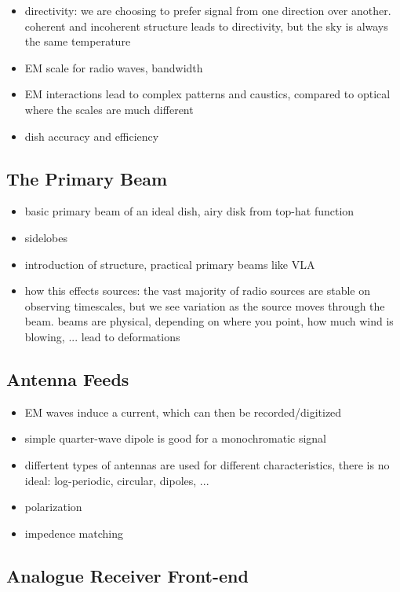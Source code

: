 \documentclass[usenatbib,usegraphicx]{article}
\begin{document}
\begin{itemize}
\item directivity: we are choosing to prefer signal from one direction over another. coherent and incoherent structure leads to directivity, but the sky is always the same temperature
\item EM scale for radio waves, bandwidth
\item EM interactions lead to complex patterns and caustics, compared to optical where the scales are much different
\item dish accuracy and efficiency
\end{itemize}

\subsection{The Primary Beam}

\begin{itemize}
\item basic primary beam of an ideal dish, airy disk from top-hat function
\item sidelobes
\item introduction of structure, practical primary beams like VLA
\item how this effects sources: the vast majority of radio sources are stable on observing timescales, but we see variation as the source moves through the beam. beams are physical, depending on where you point, how much wind is blowing, ... lead to deformations
\end{itemize}

\subsection{Antenna Feeds}

\begin{itemize}
\item EM waves induce a current, which can then be recorded/digitized
\item simple quarter-wave dipole is good for a monochromatic signal
\item differtent types of antennas are used for different characteristics, there is no ideal: log-periodic, circular, dipoles, ...
\item polarization
\item impedence matching
\end{itemize}

\subsection{Analogue Receiver Front-end}
\end{document}
